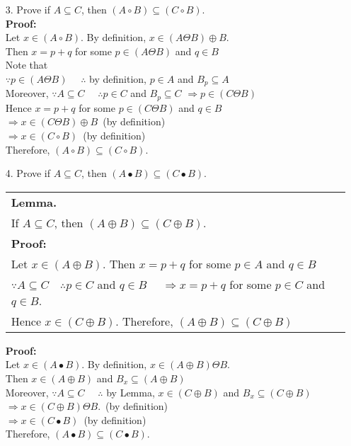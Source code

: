 \documentclass[12pt,a4paper]{article}
\begin{document}
\begin{enumerate}
\newpage
\item[3.]	
Prove if $A \subseteq C$, then
$({A \circ B}) \subseteq (C \circ B)$.\\
{\bf Proof:}\\
Let $x \in (A \circ B)$.
By definition, $x \in (A \Theta B) \oplus B$.\\
Then $x=p+q$
for some $p \in (A \Theta B)$ and
$q \in B$\\
Note that\\
$\because p \in (A \Theta B) \quad$
$\therefore$ by definition,
$p \in A$ and $B_p \subseteq A$\\
Moreover, $\because A \subseteq C \quad$
$\therefore p \in C$ and $B_p \subseteq C$
$\Longrightarrow p \in (C \Theta B)$\\
Hence $x=p+q$
for some $p \in (C \Theta B)$ and $q \in B$\\
$\Longrightarrow x \in (C \Theta B) \oplus B$
\,(by definition)\\
$\Longrightarrow x \in (C \circ B)$
\,(by definition)\\ 
Therefore, $({A \circ B}) \subseteq (C \circ B)$.
\item[4.]	
Prove if $A \subseteq C$, then
$({A \bullet B}) \subseteq ({C \bullet B})$.

\begin{tabular}{|l|}
\hline
{\bf Lemma.}\\
If $A \subseteq C$, then
$({A \oplus B}) \subseteq ({C \oplus B})$.\\
{\bf Proof:}\\
Let $x \in ({A \oplus B})$.
Then $x=p+q$ for some $p \in A$ and $q \in B$\\
$\because A \subseteq C \quad
\therefore p \in C$ and $q \in B$
$\quad \Longrightarrow x=p+q$
for some $p \in C$ and $q \in B$.\\
Hence $x \in (C \oplus B)$.
Therefore,
$({A \oplus B}) \subseteq ({C \oplus B})$\\
\hline
\end{tabular}

{\bf Proof:}\\
Let $x \in (A \bullet B)$.
By definition, $x \in (A \oplus B) \Theta B$.\\
Then $x \in (A \oplus B)$ and $B_x \subseteq (A \oplus B)$\\
Moreover, $\because A \subseteq C$
$\quad \therefore$ by Lemma,
$x \in (C \oplus B)$ and $B_x \subseteq (C \oplus B)$\\
$\Longrightarrow x \in (C \oplus B) \Theta B$.
\,(by definition)\\
$\Longrightarrow x \in (C \bullet B)$
\,(by definition)\\
Therefore, $({A \bullet B}) \subseteq ({C \bullet B})$.
\end{enumerate}
\end{document}

